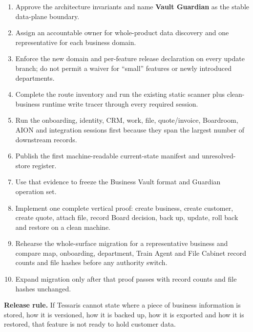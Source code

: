 \documentclass[11pt]{article}
\newcommand{\Guardian}{\textbf{Vault Guardian}}
\begin{document}
\begin{enumerate}
  \item Approve the architecture invariants and name \Guardian{} as the stable data-plane boundary.
  \item Assign an accountable owner for whole-product data discovery and one representative for each business domain.
  \item Enforce the new domain and per-feature release declaration on every update branch; do not permit a waiver for ``small'' features or newly introduced departments.
  \item Complete the route inventory and run the existing static scanner plus clean-business runtime write tracer through every required session.
  \item Run the onboarding, identity, CRM, work, file, quote/invoice, Boardroom, AION and integration sessions first because they span the largest number of downstream records.
  \item Publish the first machine-readable current-state manifest and unresolved-store register.
  \item Use that evidence to freeze the Business Vault format and Guardian operation set.
  \item Implement one complete vertical proof: create business, create customer, create quote, attach file, record Board decision, back up, update, roll back and restore on a clean machine.
  \item Rehearse the whole-surface migration for a representative business and compare map, onboarding, department, Train Agent and File Cabinet record counts and file hashes before any authority switch.
  \item Expand migration only after that proof passes with record counts and file hashes unchanged.
\end{enumerate}

\vfill
\noindent\colorbox{TessarisGreenPale}{\parbox{0.96\linewidth}{
\textbf{Release rule.} If Tessaris cannot state where a piece of business information is stored, how it is versioned, how it is backed up, how it is exported and how it is restored, that feature is not ready to hold customer data.
}}
\end{document}
